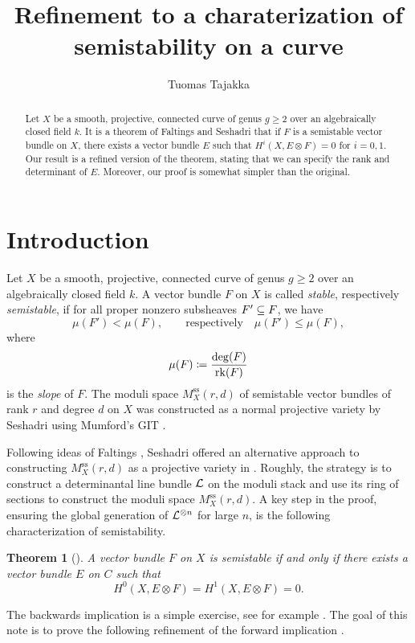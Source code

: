 \documentclass[letterpaper,12pt]{amsart}
\title[Characterization of semistability]{Refinement to a charaterization of semistability on a curve}
\author{Tuomas Tajakka}
\date{}
\newtheorem{thm}{Theorem}[section]
\theoremstyle{remark}
\begin{document}
\maketitle

\begin{abstract}
    Let $X$ be a smooth, projective, connected curve of genus $g \ge 2$ over an algebraically closed field $k$. It is a theorem of Faltings and Seshadri that if $F$ is a semistable vector bundle on $X$, there exists a vector bundle $E$ such that $H^i(X, E \otimes F) = 0$ for $i = 0, 1$. Our result is a refined version of the theorem, stating that we can specify the rank and determinant of $E$. Moreover, our proof is somewhat simpler than the original.
\end{abstract}

\section{Introduction}
Let $X$ be a smooth, projective, connected curve of genus $g \ge 2$ over an algebraically closed field $k$. A vector bundle $F$ on $X$ is called \textit{stable}, respectively \textit{semistable}, if for all proper nonzero subsheaves $F' \subseteq F$, we have
\[ \mu(F') < \mu(F), \qquad \text{respectively} \quad \mu(F') \leq \mu(F), \]
where 
\[ \mu(F) \coloneqq \frac{\deg(F)}{\operatorname{\mathrm{rk}}(F)} \]
is the \textit{slope} of $F$. The moduli space $M^{\text{ss}}_X(r,d)$ of semistable vector bundles of rank $r$ and degree $d$ on $X$ was constructed as a normal projective variety by Seshadri \cite{seshadri-space-of-unitary} using Mumford's GIT \cite{GIT}. 

Following ideas of Faltings \cite{faltings}, Seshadri offered an alternative approach to constructing $M^{\text{ss}}_X(r,d)$ as a projective variety in \cite{seshadri}. Roughly, the strategy is to construct a determinantal line bundle $\mathcal{L}$ on the moduli stack and use its ring of sections to construct the moduli space $M^{\text{ss}}_X(r,d)$. A key step in the proof, ensuring the global generation of $\mathcal{L}^{\otimes n}$ for large $n$, is the following characterization of semistability.
\begin{thm}[{\cite[Theorem 6.2]{seshadri}}]
    A vector bundle $F$ on $X$ is semistable if and only if there exists a vector bundle $E$ on $C$ such that
    \[ H^0(X, E \otimes F) = H^1(X, E \otimes F) = 0. \]
\end{thm}
The backwards implication is a simple exercise, see for example \cite[Theorem 2.13]{MS}. The goal of this note is to prove the following refinement of the forward implication \cite[Lemma 3.1 ("First Main Lemma")]{seshadri}.
\end{document}
